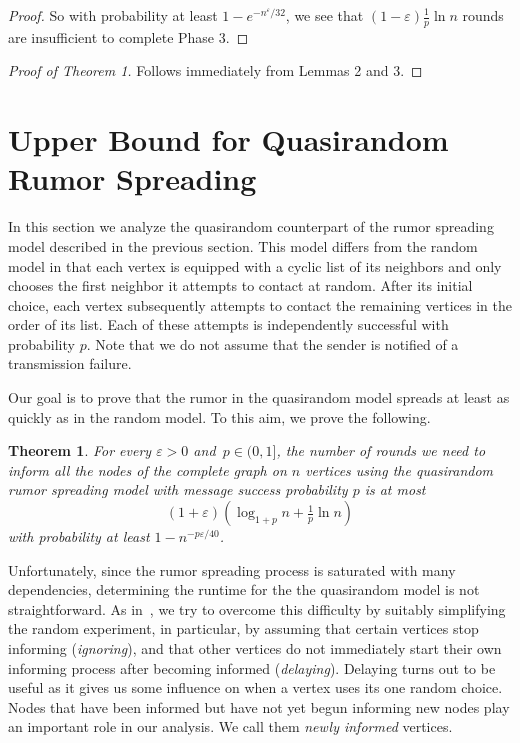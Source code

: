 \documentclass[12pt]{article}
\newtheorem{theorem}{Theorem}
\newcommand{\e}{\varepsilon}
\begin{document}
{\begin{proof}
So with probability at least $1 - e^{-n^\e/32}$, we see that $(1-\e)\frac{1}{p}\ln n$ rounds are insufficient to complete Phase 3.
\end{proof}


\begin{proof}[Proof of Theorem 1]
 Follows immediately from Lemmas 2 and 3.
\end{proof}



\section{Upper Bound for Quasirandom Rumor Spreading}\label{sec:upper}

	
In this section we analyze the quasirandom counterpart of the rumor spreading model described in the previous section.
This model differs from the random model in that each vertex is equipped with a cyclic list of its neighbors and only chooses the first neighbor it attempts to contact at random. After its initial choice, each vertex subsequently attempts to contact the remaining vertices in the order of its list.
Each of these attempts is independently successful with probability $p$. Note that we do not assume that the sender is notified of a transmission failure.

Our goal is to prove that the rumor in the quasirandom model spreads at least as quickly as in the random model. To this aim, we prove the following.

\begin{theorem}\label{thm:upper}
For every $\e>0$ and~$p \in (0,1]$, the number of rounds we need to inform all the nodes of the complete graph on $n$ vertices using the quasirandom rumor spreading model with message success probability $p$ is at most
\begin{equation*}
(1+\e)\left(\log_{1+p}n+\tfrac{1}{p}\ln n\right)
\end{equation*}
with probability at least $1 - n^{-p\e/40}$.
\end{theorem}

Unfortunately, since the rumor spreading process is saturated with many dependencies, determining the runtime for the the quasirandom model is not straightforward. As in~\cite{DFS08}, we try to overcome this difficulty by suitably simplifying the random experiment, in particular, by assuming that certain vertices stop informing (\emph{ignoring}), and that other vertices do not immediately start their own informing process after becoming informed (\emph{delaying}). 
Delaying turns out to be useful as it gives us some influence on when a vertex uses its one random choice. Nodes that have been informed but have not yet begun informing new nodes play an important role in our analysis. We call them \emph{newly informed} vertices.

}
\end{document}
